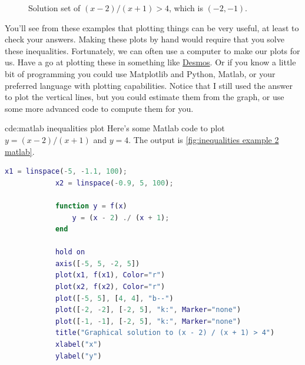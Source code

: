 \documentclass[fleqn]{LectureClass/LectureClass}
\begin{document}
    \begin{figure}
        \centering
        \caption[Solution set of \((x - 2)/(x + 1) > 4\).]{Solution set of \((x - 2)/(x + 1) > 4\), which is \((-2, -1)\).}
        \label{fig:inequalities example 2 solution}
    \end{figure}
    
    You'll see from these examples that plotting things can be very useful, at least to check your answers.
    Making these plots by hand would require that you solve these inequalities.
    Fortunately, we can often use a computer to make our plots for us.
    Have a go at plotting these in something like \href{https://www.desmos.com/calculator}{Desmos}.
    Or if you know a little bit of programming you could use Matplotlib and Python, Matlab, or your preferred language with plotting capabilities.
    Notice that I still used the answer to plot the vertical lines, but you could estimate them from the graph, or use some more advanced code to compute them for you.
    
    \begin{cde}{}{cde:matlab inequalities plot}
        Here's some Matlab code to plot \(y = (x - 2) / (x + 1)\) and \(y = 4\).
        The output is \cref{fig:inequalities example 2 matlab}.
        
        \begin{lstlisting}[gobble=12, language=Matlab]
            x1 = linspace(-5, -1.1, 100);
            x2 = linspace(-0.9, 5, 100);
            
            function y = f(x)
                y = (x - 2) ./ (x + 1);
            end
            
            hold on
            axis([-5, 5, -2, 5])
            plot(x1, f(x1), Color="r")
            plot(x2, f(x2), Color="r")
            plot([-5, 5], [4, 4], "b--")
            plot([-2, -2], [-2, 5], "k:", Marker="none")
            plot([-1, -1], [-2, 5], "k:", Marker="none")
            title("Graphical solution to (x - 2) / (x + 1) > 4")
            xlabel("x")
            ylabel("y")
        \end{lstlisting}
    \end{cde}
    
\end{document}
